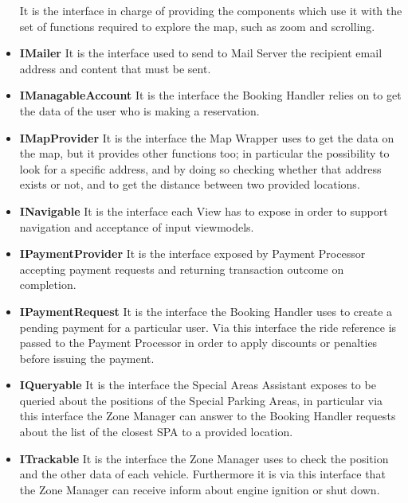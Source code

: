 \begin{itemize}
    It is the interface in charge of providing the components which use it with the set of functions required to explore the map, such as zoom and scrolling.
    \item\textbf{IMailer}\newline
    It is the interface used to send to Mail Server the recipient email address and content that must be sent.
    \item\textbf{IManagableAccount}\newline
    It is the interface the Booking Handler relies on to get the data of the user who is making a reservation.
    \item\textbf{IMapProvider}\newline
    It is the interface the Map Wrapper uses to get the data on the map, but it provides other functions too; in particular the possibility to look for a specific address, and by doing so checking whether that address exists or not, and to get the distance between two provided locations.
    \item\textbf{INavigable}\newline
    It is the interface each View has to expose in order to support navigation and acceptance of input viewmodels.
    \item\textbf{IPaymentProvider}\newline
    It is the interface exposed by Payment Processor accepting payment requests and returning transaction outcome on completion.
    \item\textbf{IPaymentRequest}\newline
    It is the interface the Booking Handler uses to create a pending payment for a particular user. Via this interface the ride reference is passed to the Payment Processor in order to apply discounts or penalties before issuing the payment.
    \item\textbf{IQueryable}\newline
    It is the interface the Special Areas Assistant exposes to be queried about the positions of the Special Parking Areas, in particular via this interface the Zone Manager can answer to the Booking Handler requests about the list of the closest SPA to a provided location.
    \item\textbf{ITrackable}\newline
    It is the interface the Zone Manager uses to check the position and the other data of each vehicle. Furthermore it is via this interface that the Zone Manager can receive inform about engine ignition or shut down.

\end{itemize}
